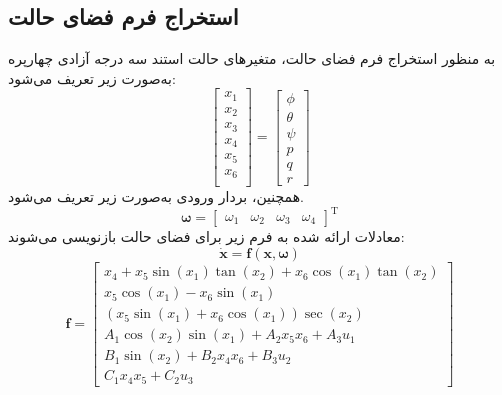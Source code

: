 \documentclass{CCI2020}
\begin{document}
\subsection{استخراج فرم فضای حالت}
به منظور استخراج فرم فضای حالت، متغیرهای حالت استند سه درجه آزادی چهارپره به‌صورت زیر تعریف می‌شود:
\begin{equation}
	\begin{bmatrix}
		x_1\\x_2\\x_3\\x_4\\x_5\\x_6\\
	\end{bmatrix} = 
	\begin{bmatrix}
		\phi\\ \theta \\ \psi \\ p\\ q\\ r
	\end{bmatrix}
\end{equation}
همچنین، بردار ورودی به‌صورت زیر تعریف می‌شود.
\begin{equation}
	\boldsymbol{\omega} = \begin{bmatrix}
		\omega_1&\omega_2&\omega_3&\omega_4
	\end{bmatrix}^\mathrm{T}
\end{equation}
معادلات ارائه شده به فرم زیر برای فضای حالت بازنویسی می‌شوند:
\begin{equation}
	\boldsymbol{\dot x} = \boldsymbol f(\boldsymbol x, \boldsymbol{\omega})
\end{equation}
\begin{equation}
	\boldsymbol f = \begin{bmatrix}
		x_4 + x_5\sin(x_1)\tan(x_2) + x_6\cos(x_1)\tan(x_2)\\
		x_5\cos(x_1)- x_6\sin(x_1)\\
		(x_5\sin(x_1) + x_6\cos(x_1))\sec(x_2)\\
		A_1\cos(x_2)\sin(x_1) + 
		A_2x_5x_6 + A_3u_1
		\\
		B_1\sin(x_2) + 
		B_2x_4x_6 + B_3u_2\\
		C_1x_4x_5 + 
		C_2u_3
	\end{bmatrix}
\end{equation} 
\label{IntroMainFeat}
\end{document}
